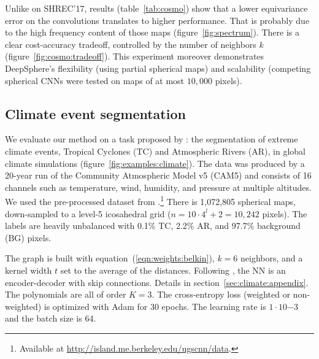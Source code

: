 \documentclass{article} %
\newcommand{\todo}[1]{{\color[rgb]{.6,.1,.6}{#1}}}
\newcommand{\figref}[1]{figure~\ref{fig:#1}}
\newcommand{\tabref}[1]{table~\ref{tab:#1}}
\newcommand{\secref}[1]{section~\ref{sec:#1}}
\newcommand{\eqnref}[1]{equation~(\ref{eqn:#1})}
\begin{document}
Unlike on SHREC'17, results (\tabref{cosmo}) show that a lower equivariance error on the convolutions translates to higher performance.
That is probably due to the high frequency content of those maps (\figref{spectrum}).
There is a clear cost-accuracy tradeoff, controlled by the number of neighbors $k$ (\figref{cosmo:tradeoff}).
This experiment moreover demonstrates DeepSphere's flexibility (using partial spherical maps) and scalability (competing spherical CNNs were tested on maps of at most $10,000$ pixels).

\subsection{Climate event segmentation} \label{sec:exp:climate}

We evaluate our method on a task proposed by \citep{mudigonda2017climateevents}: the segmentation of extreme climate events, Tropical Cyclones (TC) and Atmospheric Rivers (AR), in global climate simulations (\figref{examples:climate}).
The data was produced by a 20-year run of the Community Atmospheric Model v5 (CAM5) and consists of 16 channels such as temperature, wind, humidity, and pressure at multiple altitudes.
We used the pre-processed dataset from \citep{jiang2019sphericalcnn}.\footnote{Available at \url{http://island.me.berkeley.edu/ugscnn/data}.}
There is 1,072,805 spherical maps, down-sampled to a level-5 icosahedral grid ($n = 10 \cdot 4^l + 2 = 10,242$ pixels).
The labels are heavily unbalanced with 0.1\% TC, 2.2\% AR, and 97.7\% background (BG) pixels.

The graph is built with \eqnref{weights:belkin}, $k = 6$ neighbors, and a kernel width $t$ set to the average of the distances.
Following \citet{jiang2019sphericalcnn}, the NN is an encoder-decoder with skip connections.
Details in \secref{climate:appendix}.
The polynomials are all of order $K=3$.
The cross-entropy loss (weighted or non-weighted) is optimized with Adam for 30 epochs.
The learning rate is $1 \cdot 10{-3}$ and the batch size is 64.
\end{document}
